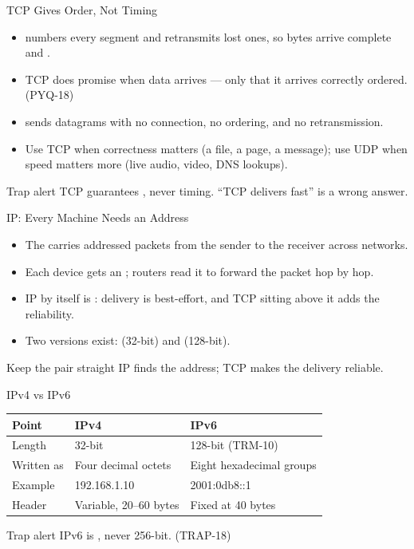 \documentclass[aspectratio=169]{beamer}
\begin{document}
\begin{frame}{TCP Gives Order, Not Timing}
  \begin{itemize}
    \item {} numbers every segment and retransmits lost ones, so bytes
      arrive complete and .
    \item TCP does  promise when data arrives --- only that it
      arrives correctly ordered. (PYQ-18)
    \item {} sends datagrams with no connection, no ordering, and no
      retransmission.
    \item Use TCP when correctness matters (a file, a page, a message); use
      UDP when speed matters more (live audio, video, DNS lookups).
  \end{itemize}
  \begin{alertblock}{Trap alert}
    TCP guarantees , never timing. ``TCP delivers fast'' is a
    wrong answer.
  \end{alertblock}
\end{frame}

\begin{frame}{IP: Every Machine Needs an Address}
  \begin{itemize}
    \item The  carries addressed packets from the
      sender to the receiver across networks.
    \item Each device gets an ; routers read it to forward
      the packet hop by hop.
    \item IP by itself is : delivery is best-effort, and TCP
      sitting above it adds the reliability.
    \item Two versions exist:  (32-bit) and  (128-bit).
  \end{itemize}
  \begin{block}{Keep the pair straight}
    IP finds the address; TCP makes the delivery reliable.
  \end{block}
\end{frame}

\begin{frame}{IPv4 vs IPv6}
  \begin{center}
    \begin{tabular}{lll}
      \toprule
      \textbf{Point} & \textbf{IPv4} & \textbf{IPv6} \\
      \midrule
      Length & 32-bit & 128-bit (TRM-10) \\
      Written as & Four decimal octets & Eight hexadecimal groups \\
      Example & 192.168.1.10 & 2001:0db8::1 \\
      Header & Variable, 20--60 bytes & Fixed at 40 bytes \\
      \bottomrule
    \end{tabular}
  \end{center}
  \vspace{0.25cm}
  \begin{alertblock}{Trap alert}
    IPv6 is , never 256-bit. (TRAP-18)
  \end{alertblock}
\end{frame}
\end{document}
